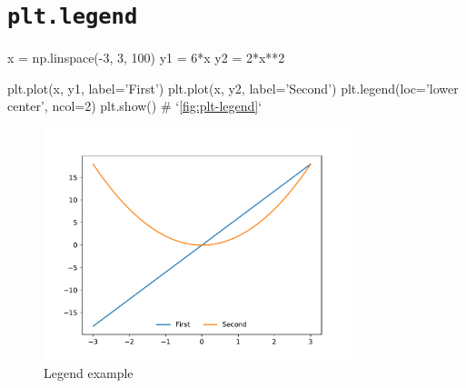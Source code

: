\documentclass{report}
\begin{document}
\section{\texttt{plt.legend}}
\begin{py}
x = np.linspace(-3, 3, 100)
y1 = 6*x
y2 = 2*x**2

plt.plot(x, y1, label='First')
plt.plot(x, y2, label='Second')
plt.legend(loc='lower center', ncol=2)
plt.show() # `\autoref{fig:plt-legend}`
\end{py}

\begin{figure}[!htb]
  \centering
  \includegraphics[width=90mm]{plt-legend}
  \caption{Legend example}
  \label{fig:plt-legend}
\end{figure}
\end{document}
